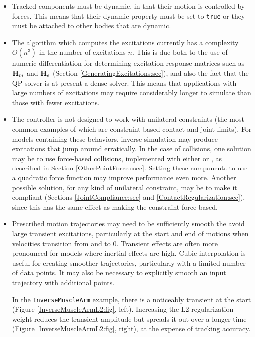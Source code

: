 \begin{itemize}

\item Tracked components must be dynamic, in that their
motion is controlled by forces. This means that their {\sf dynamic} property
must be set to {\tt true} or they must be attached to other bodies that are
dynamic.

\item The algorithm which computes the excitations currently
has a complexity $O(n^3)$ in the number of excitations $n$.  This is due both
to the use of numeric differentiation for determining excitation response
matrices such as ${\bf H}_m$ and ${\bf H}_e$ (Section
\ref{GeneratingExcitations:sec}), and also the fact that the QP solver
is at present a dense solver. This means that applications with large numbers
of excitations may require considerably longer to simulate than those with
fewer excitations.

\item The controller is not designed to work with
unilateral constraints (the most common examples of which are constraint-based
contact and joint limits). For models containing these behaviors, inverse
simulation may produce excitations that jump around erratically.  In the case
of collisions, one solution may be to use force-based collisions, implemented
with either
 or
, as described in Section
\ref{OtherPointForces:sec}. Setting these components to
use a quadratic force function may improve performance even more.  Another
possible solution, for any kind of unilateral constraint, may be to make it
compliant (Sections \ref{JointCompliance:sec}
and \ref{ContactRegularization:sec}), since this has the same effect as making
the constraint force-based.

\item Prescribed motion trajectories may need to be sufficiently
smooth the avoid large transient excitations, particularly at the start and end
of motions when velocities transition from and to 0. Transient effects are
often more pronounced for models where inertial effects are high.  Cubic
interpolation is useful for creating smoother trajectories, particularly with a
limited number of data points. It may also be necessary to explicitly smooth an
input trajectory with additional points.

In the {\tt InverseMuscleArm} example, there is a noticeably transient at the
start (Figure \ref{InverseMuscleArmL2:fig}, left). Increasing the L2
regularization weight reduces the transient amplitude but spreads it out over a
longer time (Figure \ref{InverseMuscleArmL2:fig}, right), at the expense of
tracking accuracy.

\end{itemize}

%
\ifdefined\maindoc
\else

\fi
